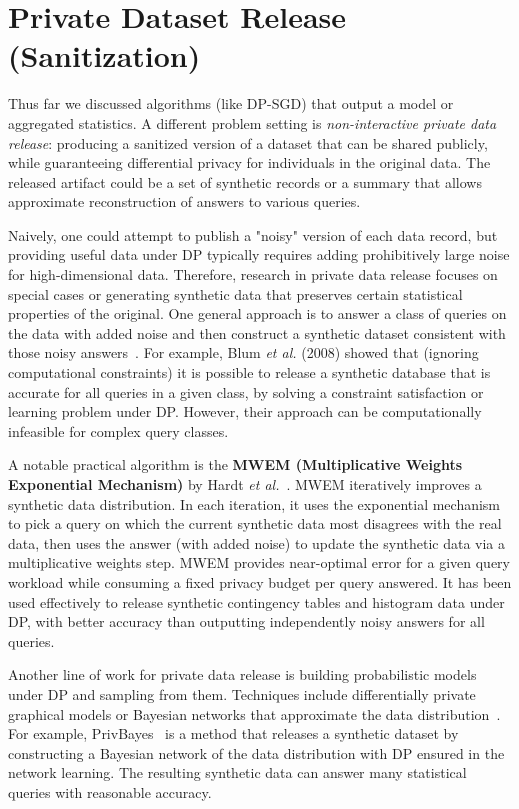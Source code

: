 \documentclass[11pt]{article}
\theoremstyle{remark}
\theoremstyle{definition}
\theoremstyle{plain}
\begin{document}
\section{Private Dataset Release (Sanitization)}

Thus far we discussed algorithms (like DP-SGD) that output a model or aggregated statistics. A different problem setting is \emph{non-interactive private data release}: producing a sanitized version of a dataset that can be shared publicly, while guaranteeing differential privacy for individuals in the original data. The released artifact could be a set of synthetic records or a summary that allows approximate reconstruction of answers to various queries.

Naively, one could attempt to publish a "noisy" version of each data record, but providing useful data under DP typically requires adding prohibitively large noise for high-dimensional data. Therefore, research in private data release focuses on special cases or generating synthetic data that preserves certain statistical properties of the original. One general approach is to answer a class of queries on the data with added noise and then construct a synthetic dataset consistent with those noisy answers~\cite{Blum2008}. For example, Blum \textit{et al.} (2008) showed that (ignoring computational constraints) it is possible to release a synthetic database that is accurate for all queries in a given class, by solving a constraint satisfaction or learning problem under DP. However, their approach can be computationally infeasible for complex query classes.

A notable practical algorithm is the \textbf{MWEM (Multiplicative Weights Exponential Mechanism)} by Hardt \textit{et al.}~\cite{Hardt2012}. MWEM iteratively improves a synthetic data distribution. In each iteration, it uses the exponential mechanism to pick a query on which the current synthetic data most disagrees with the real data, then uses the answer (with added noise) to update the synthetic data via a multiplicative weights step. MWEM provides near-optimal error for a given query workload while consuming a fixed privacy budget per query answered. It has been used effectively to release synthetic contingency tables and histogram data under DP, with better accuracy than outputting independently noisy answers for all queries.

Another line of work for private data release is building probabilistic models under DP and sampling from them. Techniques include differentially private graphical models or Bayesian networks that approximate the data distribution~\cite{Zhang2017}. For example, PrivBayes~\cite{Zhang2017} is a method that releases a synthetic dataset by constructing a Bayesian network of the data distribution with DP ensured in the network learning. The resulting synthetic data can answer many statistical queries with reasonable accuracy. 
\end{document}
